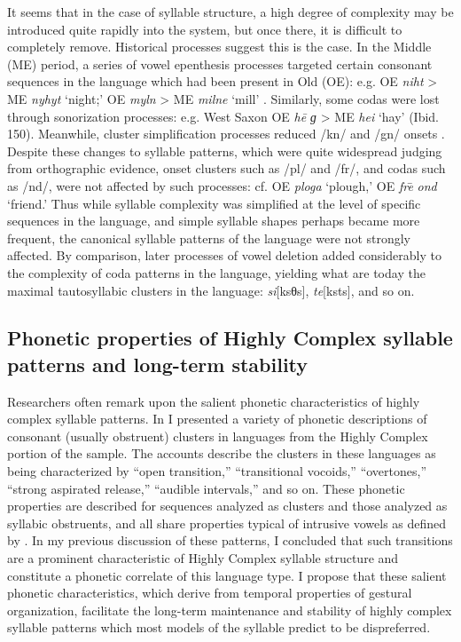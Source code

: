   It seems that in the case of syllable structure, a high degree of complexity may be introduced quite rapidly into the system, but once there, it is difficult to completely remove. Historical processes suggest this is the case. In the Middle  (ME) period, a series of vowel epenthesis processes targeted certain consonant sequences in the language which had been present in Old  (OE): e.g. OE \textit{niht} > ME \textit{nyhyt} ‘night;’ OE \textit{myln} > ME \textit{milne} ‘mill’ \parencite[167, 170]{Jones1989}. Similarly, some codas were lost through sonorization processes: e.g. West Saxon OE \textit{he\={} ɡ} > ME \textit{hei} ‘hay’ (Ibid. 150). Meanwhile, cluster simplification processes reduced /kn/ and /gn/ onsets \citep{Minkova2003}. Despite these changes to syllable patterns, which were quite widespread judging from orthographic evidence, onset clusters such as /pl/ and /fr/, and codas such as /nd/, were not affected by such processes: cf. OE \textit{ploga} ‘plough,’ OE \textit{fre}\textsf{\={} }\textit{ond} ‘friend.’ Thus while syllable complexity was simplified at the level of specific sequences in the language, and simple syllable shapes perhaps became more frequent, the canonical syllable patterns of the language were not strongly affected. By comparison, later processes of vowel deletion added considerably to the complexity of coda patterns in the language, yielding what are today the maximal tautosyllabic clusters in the language: \textit{si}[ksθs], \textit{te}[ksts], and so on.

\subsection{Phonetic properties of Highly Complex syllable patterns and long-term stability}\label{sec:8.5.3}

  Researchers often remark upon the salient phonetic characteristics of highly complex syllable patterns. In  I presented a variety of phonetic descriptions of consonant (usually obstruent) clusters in languages from the Highly Complex portion of the sample. The accounts describe the clusters in these languages as being characterized by ``open transition,'' ``transitional vocoids,'' ``overtones,'' ``strong aspirated release,'' ``audible intervals,'' and so on. These phonetic properties are described for sequences analyzed as clusters and those analyzed as syllabic obstruents, and all share properties typical of intrusive vowels as defined by \citet{Hall2006}. In my previous discussion of these patterns, I concluded that such transitions are a prominent characteristic of Highly Complex syllable structure and constitute a phonetic correlate of this language type. I propose that these salient phonetic characteristics, which derive from temporal properties of gestural organization, facilitate the long-term maintenance and stability of highly complex syllable patterns which most models of the syllable predict to be dispreferred.

